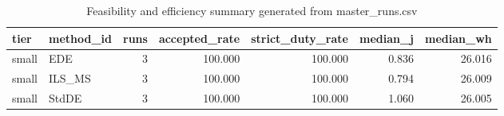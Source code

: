 \begin{table}[!t]
\centering
\caption{Feasibility and efficiency summary generated from master_runs.csv}
\label{tab:feasibility_summary_generated}
\begin{tabular}{llrrrrr}
\toprule
tier & method_id & runs & accepted_rate & strict_duty_rate & median_j & median_wh \\
\midrule
small & EDE & 3 & 100.000 & 100.000 & 0.836 & 26.016 \\
small & ILS_MS & 3 & 100.000 & 100.000 & 0.794 & 26.009 \\
small & StdDE & 3 & 100.000 & 100.000 & 1.060 & 26.005 \\
\bottomrule
\end{tabular}

\end{table}